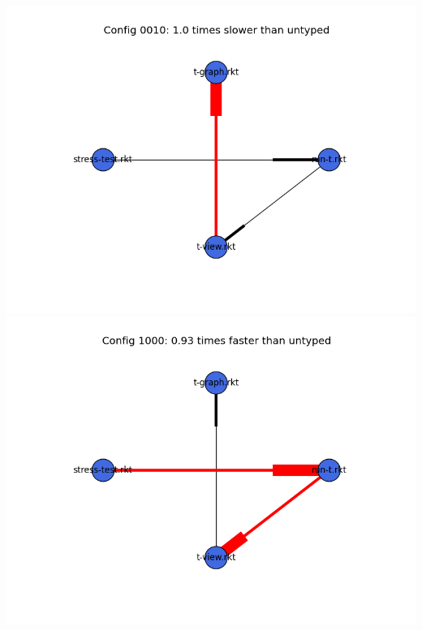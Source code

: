 \documentclass{article}
\begin{document}
\begin{itemize}
\includegraphics[width=\textwidth]{mbta-2015-03-26-module-graph-0010.png}
\includegraphics[width=\textwidth]{mbta-2015-03-26-module-graph-1000.png}
\end{itemize}
\end{document}
